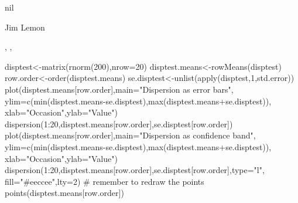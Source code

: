 \begin{Value}
nil
\end{Value}
\begin{Author}\relax
Jim Lemon
\end{Author}
\begin{SeeAlso}\relax
{}, ,
\end{SeeAlso}
\begin{Examples}
\begin{ExampleCode}
 disptest<-matrix(rnorm(200),nrow=20)
 disptest.means<-rowMeans(disptest)
 row.order<-order(disptest.means)
 se.disptest<-unlist(apply(disptest,1,std.error))
 plot(disptest.means[row.order],main="Dispersion as error bars",
  ylim=c(min(disptest.means-se.disptest),max(disptest.means+se.disptest)),
  xlab="Occasion",ylab="Value")
 dispersion(1:20,disptest.means[row.order],se.disptest[row.order])
 plot(disptest.means[row.order],main="Dispersion as confidence band",
  ylim=c(min(disptest.means-se.disptest),max(disptest.means+se.disptest)),
  xlab="Occasion",ylab="Value")
 dispersion(1:20,disptest.means[row.order],se.disptest[row.order],type="l",
  fill="#eeccee",lty=2)
 # remember to redraw the points
 points(disptest.means[row.order])
\end{ExampleCode}
\end{Examples}

